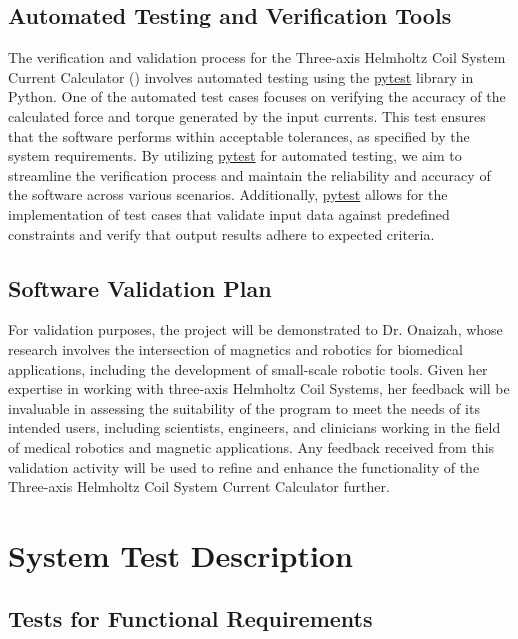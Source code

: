 \documentclass[12pt, titlepage]{article}
\begin{document}
\subsection{Automated Testing and Verification Tools}
The verification and validation process for the Three-axis Helmholtz Coil System Current Calculator (\progname{}) involves automated testing using the \href{https://docs.pytest.org/en/8.0.x/}{pytest} library in Python. One of the automated test cases focuses on verifying the accuracy of the calculated force and torque generated by the input currents. This test ensures that the software performs within acceptable tolerances, as specified by the system requirements. By utilizing \href{https://docs.pytest.org/en/8.0.x/}{pytest} for automated testing, we aim to streamline the verification process and maintain the reliability and accuracy of the software across various scenarios. Additionally, \href{https://docs.pytest.org/en/8.0.x/}{pytest} allows for the implementation of test cases that validate input data against predefined constraints and verify that output results adhere to expected criteria.



\subsection{Software Validation Plan}\label{sec:SysTestDisc}

For validation purposes, the project will be demonstrated to Dr. Onaizah, whose research involves the intersection of magnetics and robotics for biomedical applications, including the development of small-scale robotic tools. Given her expertise in working with three-axis Helmholtz Coil Systems, her feedback will be invaluable in assessing the suitability of the program to meet the needs of its intended users, including scientists, engineers, and clinicians working in the field of medical robotics and magnetic applications. Any feedback received from this validation activity will be used to refine and enhance the functionality of the Three-axis Helmholtz Coil System Current Calculator further.

\section{System Test Description}
	
\subsection{Tests for Functional Requirements}
\end{document}
